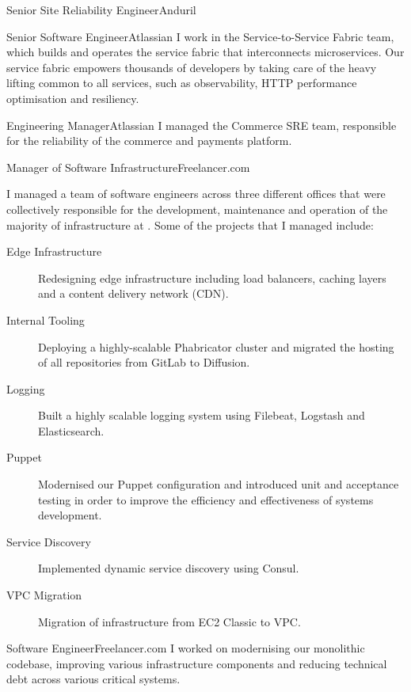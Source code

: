 \begin{professionalExperience}

{Senior Site Reliability Engineer}{Anduril}
{}

{Senior Software Engineer}{Atlassian}
{
  I work in the Service-to-Service Fabric team, which builds and operates the
  service fabric that interconnects  microservices. Our
  service fabric empowers thousands of developers by taking care of the heavy
  lifting common to all services, such as observability, HTTP performance
  optimisation and resiliency.
}

{Engineering Manager}{Atlassian}
{
  I managed the Commerce SRE team, responsible for the reliability of the
  commerce and payments platform.
}

{Manager of Software Infrastructure}{Freelancer.com}
{
  I managed a team of software engineers across three different offices that
  were collectively responsible for the development, maintenance and operation
  of the majority of infrastructure at . Some of the
  projects that I managed include:

  \begin{description}
    \item[Edge Infrastructure] Redesigning edge infrastructure including load
      balancers, caching layers and a content delivery network (CDN).
    \item[Internal Tooling] Deploying a highly-scalable Phabricator cluster and
      migrated the hosting of all repositories from GitLab to Diffusion.
    \item[Logging] Built a highly scalable logging system using Filebeat,
      Logstash and Elasticsearch.
    \item[Puppet] Modernised our Puppet configuration and introduced unit and
      acceptance testing in order to improve the efficiency and effectiveness of
      systems development.
    \item[Service Discovery] Implemented dynamic service discovery using Consul.
    \item[VPC Migration] Migration of infrastructure from EC2 Classic to VPC\@.
  \end{description}
}

{Software Engineer}{Freelancer.com}
{
  I worked on modernising our monolithic codebase, improving various
  infrastructure components and reducing technical debt across various critical
  systems.
}


\end{professionalExperience}

